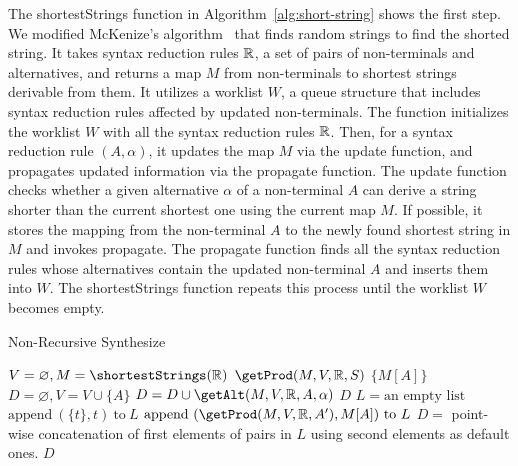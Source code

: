 The \textsf{shortestStrings} function in Algorithm~\ref{alg:short-string} shows the first step.
We modified McKenize's algorithm~\cite{cfg-gen} that finds random
strings to find the shorted string.  It takes syntax reduction rules
$\mathbb{R}$, a set of pairs of non-terminals and alternatives, and
returns a map $M$ from non-terminals to shortest strings derivable from them.
It utilizes a worklist $W$, a queue structure that includes syntax reduction rules
affected by updated non-terminals.
The function initializes the worklist $W$ with all the syntax reduction rules $\mathbb{R}$.
Then, for a syntax reduction rule $(A, \alpha)$, it updates the
map $M$ via the \textsf{update} function, and propagates updated
information via the \textsf{propagate} function.
The \textsf{update} function checks whether a given alternative $\alpha$ of
a non-terminal $A$ can derive a string shorter than the current
shortest one using the current map $M$.
If possible, it stores the mapping from the non-terminal $A$ to the
newly found shortest string in $M$ and invokes \textsf{propagate}.
The \textsf{propagate} function finds all the syntax reduction rules
whose alternatives contain the updated non-terminal $A$ 
and inserts them into $W$.  The \textsf{shortestStrings} function
repeats this process until the worklist $W$ becomes empty.

\begin{algorithm}[t]
  \caption{Non-Recursive Synthesize}
  \label{alg:non-rec-synthesize}
  \DontPrintSemicolon
   {
    $V = \varnothing, M = \shortestStrings(\ruleset)$\;
    \Return $\getProd(M, V, \ruleset, S)$\;
  }
   {
     {
      \Return $\{ M[A] \}$
    }
    $D = \varnothing, V = V \cup \{ A \}$\;
     {
      $D = D \cup \getAlt(M, V, \ruleset, A, \alpha)$\;
    }
    \Return $D$\;
  }
   {
    $L = \text{an empty list}$\;
     {
       {
        $\text{append}\ (\{ t \}, t)\ \text{to}\ L$\;
      }
       {
        $\text{append}\ (\getProd(M, V, \ruleset, A'), M[A])\ \text{to}\ L$}
    }
    $D =$ point-wise concatenation of first elements of pairs in $L$ using
    second elements as default ones.\;
    \Return $D$\;
  }
\end{algorithm}

